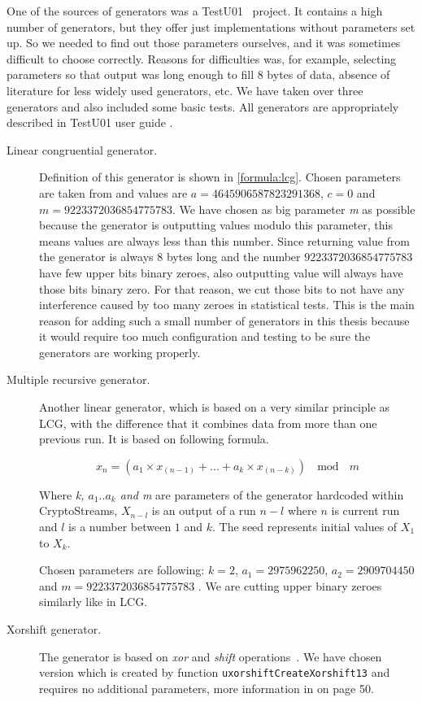 \documentclass[
    digital,    %
    oneside,    %
    color,
    11pt,
    nocover,
    notable,
    nolof,
    nolot,
    final
]{fithesis3}
\renewcommand\_{\textunderscore\allowbreak}
\begin{document}
One of the sources of generators was a TestU01~\cite{l2007testu01} project. It contains a high number of generators, but they offer just implementations without parameters set up. So we needed to find out those parameters ourselves, and it was sometimes difficult to choose correctly. Reasons for difficulties was, for example, selecting parameters so that output was long enough to fill 8 bytes of data, absence of literature for less widely used generators, etc. We have taken over three generators and also included some basic tests. All generators are appropriately described in TestU01 user guide \cite{LEcuyer07testu01}.
\begin{description}
	\item[Linear congruential generator.] Definition of this generator is shown in \cref{formula:lcg}. Chosen parameters are taken from \cite{L-Ecuyer:LCG} and values are $a = 4645906587823291368$, $c = 0$ and $m = 9223372036854775783$. We have chosen as big parameter \textit{m} as possible because the generator is outputting values modulo this parameter, this means values are always less than this number. Since returning value from the generator is always 8 bytes long and the number $ 9223372036854775783 $ have few upper bits binary zeroes, also outputting value will always have those bits binary zero. For that reason, we cut those bits to not have any interference caused by too many zeroes in statistical tests. This is the main reason for adding such a small number of generators in this thesis because it would require too much configuration and testing to be sure the generators are working properly.
	
	\item[Multiple recursive generator.] Another linear generator, which is based on a very similar principle as LCG, with the difference that it combines data from more than one previous run. It is based on following formula.
	
	\begin{equation}
	x_{n} = \left(a_{1} \times x_{\left(n-1\right)} + . . . + a_{k} \times x_{\left(n-k\right)}\right)~~\bmod~~m
	\end{equation}
	
	Where \textit{k, $a_{1} .. a_{k}$ and m} are parameters of the generator hardcoded within CryptoStreams, $X_{n-l}$ is an output of a run $n-l$ where $n$ is current run and $l$ is a number between $1$ and $k$. The seed represents initial values of $X_{1}$ to $X_{k}$.
	
	 Chosen parameters are following: $ k = 2 $, $ a_{1} = 2975962250 $, $ a_{2} = 2909704450 $ and $ m = 9223372036854775783 $ \cite{L_Ecuyer:MRG}. We are cutting upper binary zeroes similarly like in LCG.
	
	\item[Xorshift generator.] The generator is based on \textit{xor} and \textit{shift} operations~\cite{RePEc:jss:jstsof:v:008:i14}. We have chosen version which is created by function \texttt{uxorshift\_CreateXorshift13} and requires no additional parameters, more information in \cite{LEcuyer07testu01} on page 50. \\
\end{description}
\end{document}

